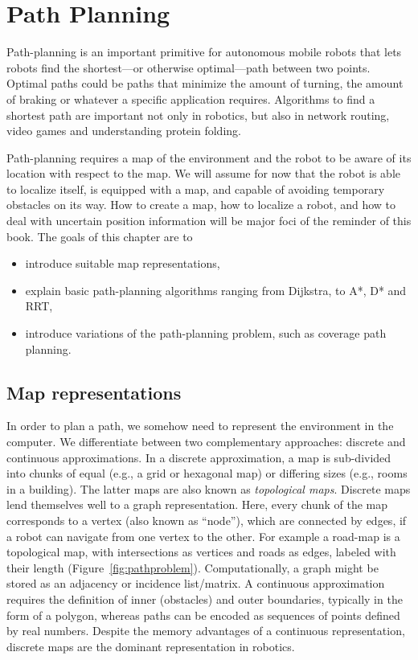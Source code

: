 \chapter{Path Planning}\label{chap:pathplanning}
Path-planning is an important primitive for autonomous mobile robots that lets robots find the shortest---or otherwise optimal---path between two points. Optimal paths could be paths that minimize the amount of turning, the amount of braking or whatever a specific application requires. Algorithms to find a shortest path are important not only in robotics, but also in network routing, video games and understanding protein folding.

Path-planning requires a map of the environment and the robot to be aware of its location with respect to the map. We will assume for now that the robot is able to localize itself,  is equipped with a map, and capable of avoiding temporary obstacles on its way. How to create a map, how to localize a robot, and how to deal with uncertain position information will be major foci of the reminder of this  book. The goals of this chapter are to

\begin{itemize}
\item introduce suitable map representations,
\item explain basic path-planning algorithms  ranging from Dijkstra, to A*, D* and RRT,
\item introduce variations of the path-planning problem, such as coverage path planning.
\end{itemize}

\section{Map representations}\label{sec:maps}
In order to plan a path, we somehow need to represent the environment in the computer. We differentiate between two complementary approaches: discrete and continuous approximations. In a discrete approximation, a map is sub-divided into chunks of equal (e.g., a grid or hexagonal map) or differing sizes (e.g., rooms in a building). The latter maps are also known as \emph{topological maps}. Discrete maps lend themselves well to a graph representation. Here, every chunk of the map corresponds to a vertex (also known as ``node''), which are connected by edges, if a robot can navigate from one vertex to the other. For example a road-map is a topological map, with intersections as vertices and roads as edges, labeled with their length (Figure~\ref{fig:pathproblem}). Computationally, a graph might be stored as an adjacency or incidence list/matrix. A continuous approximation requires the definition of inner (obstacles) and outer boundaries, typically in the form of a polygon, whereas paths can be encoded as sequences of points defined by real numbers. Despite the memory advantages of a continuous representation, discrete maps are the dominant representation in robotics.

